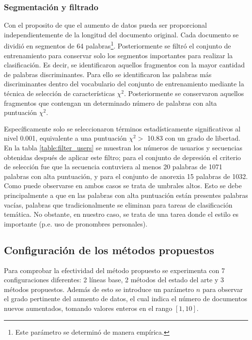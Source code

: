 \subsubsection{Segmentación y filtrado}
Con el proposito de que el aumento de datos pueda ser proporcional independientemente de la longitud del documento original. Cada documento se dividió en segmentos de 64 palabras\footnote{Este parámetro se determinó de manera empírica.}. Posteriormente se filtró el conjunto de entrenamiento para conservar solo los segmentos importantes para realizar la clasificación. Es decir, se identificaron aquellos fragmentos con la mayor cantidad de palabras discriminantes. Para ello se identificaron las  palabras más discriminantes dentro del vocabulario del conjunto de entrenamiento mediante la técnica de selección de características $\chi^2$. Posteriormente se conservaron aquellos fragmentos  que contengan un determinado número de palabras con alta puntuación $\chi^2$. 

Específicamente solo se seleccionaron términos estadísticamente significativos al nivel 0.001, equivalente a una puntuación $\chi^2 > $ 10.83 con un grado de libertad. En la tabla \ref{table:filter_users} se muestran los números de usuarios y secuencias obtenidas después de aplicar este filtro; para el conjunto de depresión el criterio de selección fue que la secuencia contuviera al menos 20 palabras de 1071 palabras con alta puntuación, y para el conjunto de anorexia 15 palabras de 1032. Como puede observarse en ambos casos se trata de umbrales altos. Esto se debe principalmente a que en las palabras con alta puntuación están presentes palabras vacías, palabras que tradicionalmente se eliminan para tareas de clasificación temática. No obstante, en nuestro caso,  se trata de una tarea donde el estilo es importante (p.e. uso de pronombres personales).



\subsection{Configuración de los métodos propuestos}

Para comprobar la efectividad del método propuesto se experimenta con  7 configuraciones diferentes: 2 líneas base, 2 métodos del estado del arte y 3 métodos propuestos. Además de esto se introduce un parámetro $n$ para observar el grado pertinente del aumento de datos, el cual indica el número de documentos nuevos aumentados, tomando valores enteros en el rango $[1,10]$.


